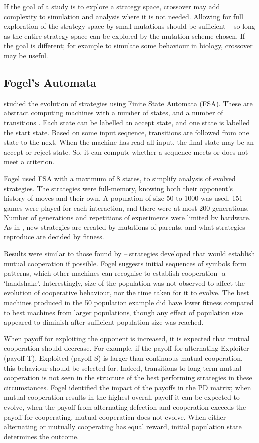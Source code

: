 \documentclass[a4paper,11pt,bcshonoursthesis,singlespace,oneside,thesisdraft,pdflatex]{cssethesis}
\begin{document}
If the goal of a study is to explore a strategy space, crossover may add complexity to simulation and analysis where it is not needed. Allowing for full exploration of the strategy space by small mutations should be sufficient -- so long as the entire strategy space can be explored by the mutation scheme chosen. 
If the goal is different; for example to simulate some behaviour in biology, crossover may be useful.

\subsection{Fogel's Automata}
\citet{fogel1993evolving} studied the evolution of strategies using Finite State Automata (FSA). 
These are abstract computing machines with a number of states, and a number of transitions \citep{Sipser2006}. 
Each state can be labelled an accept state, and one state is labelled the start state. 
Based on some input sequence, transitions are followed from one state to the next. 
When the machine has read all input, the final state may be an accept or reject state. 
So, it can compute whether a sequence meets or does not meet a criterion. 

Fogel used FSA with a maximum of 8 states, to simplify analysis of evolved strategies. The strategies were full-memory, knowing both their opponent's history of moves and their own. 
A population of size 50 to 1000 was used, 151 games were played for each interaction, and there were at most 200 generations. 
Number of generations and repetitions of experiments were limited by hardware. As in \citet{axelrod1987evolution}, new strategies are created by mutations of parents, and what strategies reproduce are decided by fitness. 

Results were similar to those found by \citep{Axelrod1997} -- strategies developed that would establish mutual cooperation if possible. Fogel suggests initial sequences of symbols form patterns, which other machines can recognise to establish cooperation- a `handshake'. 
Interestingly, size of the population was not observed to affect the evolution of cooperative behaviour, nor the time taken for it to evolve. The best machines produced in the 50 population example did have lower fitness compared to best machines from larger populations, though any effect of population size appeared to diminish after sufficient population size was reached. 

When payoff for exploiting the opponent is increased, it is expected that mutual cooperation should decrease. For example, if the payoff for alternating Exploiter (payoff T), Exploited (payoff S) is larger than continuous mutual cooperation, this behaviour should be selected for. Indeed, transitions to long-term mutual cooperation is not seen in the structure of the best performing strategies in these circumstances. Fogel identified the impact of the payoffs in the PD matrix; when mutual cooperation results in the highest overall payoff it can be expected to evolve, when the payoff from alternating defection and cooperation exceeds the payoff for cooperating, mutual cooperation does not evolve. When either alternating or mutually cooperating has equal reward, initial population state determines the outcome. 
\end{document}

